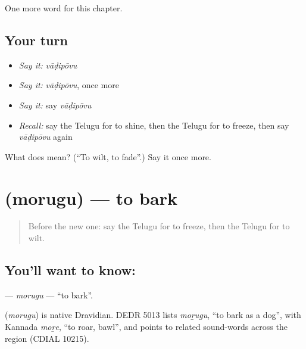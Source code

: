 \begin{grammarlens}[title={What you've built}]
One more word for this chapter.
\end{grammarlens}

\subsection*{Your turn}
\begin{itemize}
\raggedright
  \item \emph{Say it:} \emph{vāḍipōvu}
  \item \emph{Say it:} \emph{vāḍipōvu}, once more
  \item \emph{Say it:} say \emph{vāḍipōvu}
  \item \emph{Recall:} say the Telugu for to shine, then the Telugu for to freeze, then say \emph{vāḍipōvu} again
\end{itemize}

\begin{tcolorbox}[breakable,colback=teal!4,colframe=teal!35!black,title={Before you move on}]
What does  mean? (\textquotedblleft{}To wilt, to fade\textquotedblright{}.) Say it once more.
\end{tcolorbox}
\section[\texorpdfstring{\te{మొరుగు} (morugu)}{మొరుగు (morugu)}]{ (morugu) — to bark}

\label{lesson:TE-C244-morugu}



\begin{quote}
Before the new one: say the Telugu for to freeze, then the Telugu for to wilt.
\end{quote}

\subsection*{You'll want to know: }
\textbf{} — \emph{morugu} — \textquotedblleft{}to bark\textquotedblright{}.

\begin{cousinweb}
\textbf{} (\emph{morugu}) is native Dravidian. DEDR 5013 lists \emph{moṟugu}, \textquotedblleft{}to bark as a dog\textquotedblright{}, with Kannada \emph{moṟe}, \textquotedblleft{}to roar, bawl\textquotedblright{}, and points to related sound-words across the region (CDIAL 10215).
\end{cousinweb}

